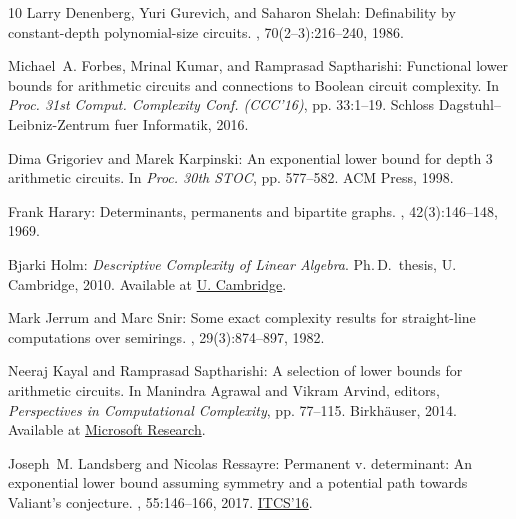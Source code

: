 \documentclass[11pt]{article}
\begin{document}
\begin{thebibliography}{10}
{\sc Larry Denenberg, Yuri Gurevich, and Saharon Shelah}: Definability by
  constant-depth polynomial-size circuits.
, 70(2--3):216--240, 1986.
\newblock [\epfmtdoi{10.1016/S0019-9958(86)80006-7}]

{\sc Michael~A. Forbes, Mrinal Kumar, and Ramprasad Saptharishi}: Functional
  lower bounds for arithmetic circuits and connections to {B}oolean circuit
  complexity.
\newblock In {\em Proc. 31st Comput. Complexity Conf. (CCC'16)}, pp. 33:1--19.
  Schloss Dagstuhl--Leibniz-Zentrum fuer Informatik, 2016.

{\sc Dima Grigoriev and Marek Karpinski}: An exponential lower bound for depth
  3 arithmetic circuits.
\newblock In {\em Proc. 30th STOC}, pp. 577--582. ACM Press, 1998.
\newblock [\epfmtdoi{10.1145/276698.276872}]

{\sc Frank Harary}: Determinants, permanents and bipartite graphs.
, 42(3):146--148, 1969.
\newblock [\epfmtdoi{10.1080/0025570X.1969.11975950}]

{\sc Bjarki Holm}: {\em Descriptive Complexity of Linear Algebra}.
\newblock Ph.\,D.\ thesis, U. Cambridge, 2010.
\newblock Available at
  \href{https://www.cl.cam.ac.uk/users/ad260/Holm_2010_phd-thesis.pdf}{U.
  Cambridge}.

{\sc Mark Jerrum and Marc Snir}: Some exact complexity results for
  straight-line computations over semirings.
, 29(3):874--897, 1982.
\newblock [\epfmtdoi{10.1145/322326.322341}]

{\sc Neeraj Kayal and Ramprasad Saptharishi}: A selection of lower bounds for
  arithmetic circuits.
\newblock In {\sc Manindra Agrawal and Vikram Arvind}, editors, {\em
  Perspectives in Computational Complexity}, pp. 77--115. Birkh\"{a}user, 2014.
\newblock Available at
  \href{https://www.microsoft.com/en-us/research/wp-content/uploads/2016/02/lowerbounds.pdf}{Microsoft
  Research}.
\newblock [\epfmtdoi{10.1007/978-3-319-05446-9\_5}]

{\sc Joseph~M. Landsberg and Nicolas Ressayre}: Permanent v. determinant: {A}n
  exponential lower bound assuming symmetry and a potential path towards
  {V}aliant's conjecture.
, 55:146--166, 2017.
\newblock \prelim \href{https://doi.org/10.1145/2840728.2840735}{ITCS'16}.


\end{thebibliography}
\end{document}
